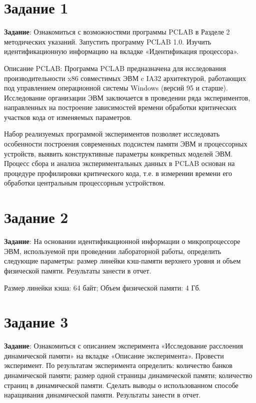 \setcounter{chapter}{1}

\section*{Задание 1}

\textbf{Задание}: Ознакомиться с возможностями программы PCLAB в Разделе 2 методических указаний. Запустить программу PCLAB 1.0. Изучить идентификационную информацию на вкладке «Идентификация процессора». 

Описание PCLAB: Программа PCLAB предназначена для исследования производительности x86 совместимых ЭВМ c IA32 архитектурой, работающих под управлением операционной системы Windows (версий 95 и старше). Исследование организации ЭВМ заключается в проведении ряда экспериментов, направленных на построение зависимостей времени обработки критических участков кода от изменяемых параметров. 

Набор реализуемых программой экспериментов позволяет исследовать особенности построения современных подсистем памяти ЭВМ и процессорных устройств, выявить конструктивные параметры конкретных моделей ЭВМ. Процесс сбора и анализа экспериментальных данных в PCLAB основан на процедуре профилировки критического кода, т.е. в измерении времени его обработки центральным процессорным устройством.

\section*{Задание 2}

\textbf{Задание}: На основании идентификационной информации о микропроцессоре ЭВМ, используемой при проведении лабораторной работы, определить следующие параметры: размер линейки кэш-памяти верхнего уровня и объем физической памяти. Результаты занести в отчет.

Размер линейки кэша: 64 байт;
Объем физической памяти: 4 Гб.

\section*{Задание 3}

\textbf{Задание}: Ознакомиться с описанием эксперимента «Исследование расслоения динамической памяти» на вкладке «Описание эксперимента». Провести эксперимент. По результатам эксперимента определить: количество банков динамической памяти; размер одной страницы динамической памяти; количество страниц в динамической памяти. Сделать выводы о использованном способе наращивания динамической памяти. Результаты занести в отчет.

